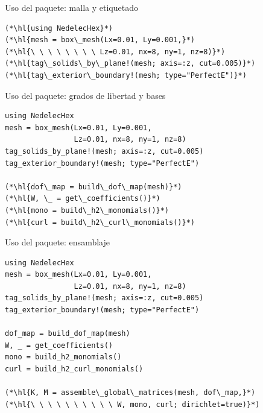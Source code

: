 \documentclass{beamer}
\begin{document}
\newcommand{\hl}[1]{\textcolor{red!80!black}{\textbf{#1}}}

\begin{frame}[fragile]{Uso del paquete: malla y etiquetado}
\vspace{-0.15cm}
\begin{lstlisting}[style=codestyle]
(*\hl{using NedelecHex}*)
(*\hl{mesh = box\_mesh(Lx=0.01, Ly=0.001,}*)
(*\hl{\ \ \ \ \ \ \ \ Lz=0.01, nx=8, ny=1, nz=8)}*)
(*\hl{tag\_solids\_by\_plane!(mesh; axis=:z, cut=0.005)}*)
(*\hl{tag\_exterior\_boundary!(mesh; type="PerfectE")}*)
\end{lstlisting}
\end{frame}

\begin{frame}[fragile]{Uso del paquete: grados de libertad y bases}
\addtocounter{framenumber}{-1}
\vspace{-0.15cm}
\begin{lstlisting}[style=codestyle]
using NedelecHex
mesh = box_mesh(Lx=0.01, Ly=0.001,
                Lz=0.01, nx=8, ny=1, nz=8)
tag_solids_by_plane!(mesh; axis=:z, cut=0.005)
tag_exterior_boundary!(mesh; type="PerfectE")

(*\hl{dof\_map = build\_dof\_map(mesh)}*)
(*\hl{W, \_ = get\_coefficients()}*)
(*\hl{mono = build\_h2\_monomials()}*)
(*\hl{curl = build\_h2\_curl\_monomials()}*)
\end{lstlisting}
\end{frame}

\begin{frame}[fragile]{Uso del paquete: ensamblaje}
\addtocounter{framenumber}{-1}
\vspace{-0.15cm}
\begin{lstlisting}[style=codestyle]
using NedelecHex
mesh = box_mesh(Lx=0.01, Ly=0.001,
                Lz=0.01, nx=8, ny=1, nz=8)
tag_solids_by_plane!(mesh; axis=:z, cut=0.005)
tag_exterior_boundary!(mesh; type="PerfectE")

dof_map = build_dof_map(mesh)
W, _ = get_coefficients()
mono = build_h2_monomials()
curl = build_h2_curl_monomials()

(*\hl{K, M = assemble\_global\_matrices(mesh, dof\_map,}*)
(*\hl{\ \ \ \ \ \ \ \ \ \ W, mono, curl; dirichlet=true)}*)
\end{lstlisting}
\end{frame}
\end{document}
